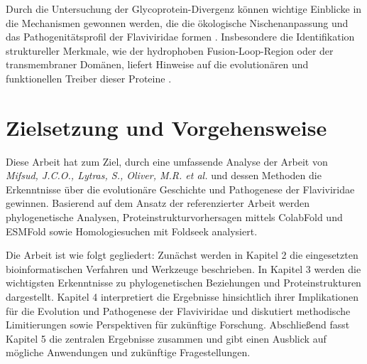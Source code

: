 Durch die Untersuchung der Glycoprotein-Divergenz können wichtige Einblicke in die Mechanismen gewonnen werden, die die ökologische Nischenanpassung und das Pathogenitätsprofil der Flaviviridae formen \autocite{mifsudMappingGlycoproteinStructure2024}. Insbesondere die Identifikation struktureller Merkmale, wie der hydrophoben Fusion-Loop-Region oder der transmembraner Domänen, liefert Hinweise auf die evolutionären und funktionellen Treiber dieser Proteine \autocite{Modis2004}.

\section{Zielsetzung und Vorgehensweise}
\label{sec:zielsetzung-und-vorgehensweise}

Diese Arbeit hat zum Ziel, durch eine umfassende Analyse der Arbeit von \textit{Mifsud, J.C.O., Lytras, S., Oliver, M.R. et al.} und dessen Methoden die Erkenntnisse über die evolutionäre Geschichte und Pathogenese der Flaviviridae gewinnen. Basierend auf dem Ansatz der referenzierter Arbeit werden phylogenetische Analysen, Proteinstrukturvorhersagen mittels ColabFold und ESMFold sowie Homologiesuchen mit Foldseek analysiert.

Die Arbeit ist wie folgt gegliedert: Zunächst werden in Kapitel 2 die eingesetzten bioinformatischen Verfahren und Werkzeuge beschrieben. In Kapitel 3 werden die wichtigsten Erkenntnisse zu phylogenetischen Beziehungen und Proteinstrukturen dargestellt. Kapitel 4 interpretiert die Ergebnisse hinsichtlich ihrer Implikationen für die Evolution und Pathogenese der Flaviviridae und diskutiert methodische Limitierungen sowie Perspektiven für zukünftige Forschung. Abschließend fasst Kapitel 5 die zentralen Ergebnisse zusammen und gibt einen Ausblick auf mögliche Anwendungen und zukünftige Fragestellungen.